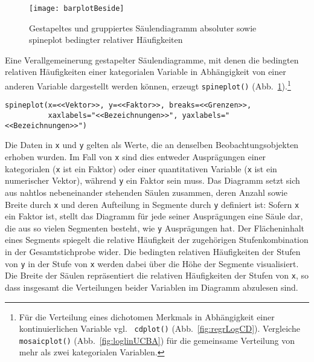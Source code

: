 \begin{figure}[ht]
\centering
\texttt{[image: barplotBeside]}
\vspace*{-1em}
\caption{Gestapeltes und gruppiertes Säulendiagramm absoluter sowie spineplot bedingter relativer Häufigkeiten}
\label{fig:barplotBeside}
\end{figure}

Eine Verallgemeinerung gestapelter Säulendiagramme, mit denen die bedingten relativen Häufigkeiten einer kategorialen Variable in Abhängigkeit von einer anderen Variable dargestellt werden können, erzeugt \lstinline!spineplot()! (Abb.\ \ref{fig:barplotBeside}).\footnote{Für die Verteilung eines dichotomen Merkmals in Abhängigkeit einer kontinuierlichen Variable vgl.\  \lstinline!cdplot()! (Abb.\ \ref{fig:regrLogCD}). Vergleiche \lstinline!mosaicplot()! (Abb.\ \ref{fig:loglinUCBA}) für die gemeinsame Verteilung von mehr als zwei kategorialen Variablen.}
\begin{lstlisting}
spineplot(x=<<Vektor>>, y=<<Faktor>>, breaks=<<Grenzen>>,
          xaxlabels="<<Bezeichnungen>>", yaxlabels="<<Bezeichnungen>>")
\end{lstlisting}

Die Daten in \lstinline!x! und \lstinline!y! gelten als Werte, die an denselben Beobachtungsobjekten erhoben wurden. Im Fall von \lstinline!x! sind dies entweder Ausprägungen einer kategorialen (\lstinline!x! ist ein Faktor) oder einer quantitativen Variable (\lstinline!x! ist ein numerischer Vektor), während \lstinline!y! ein Faktor sein muss. Das Diagramm setzt sich aus nahtlos nebeneinander stehenden Säulen zusammen, deren Anzahl sowie Breite durch \lstinline!x! und deren Aufteilung in Segmente durch \lstinline!y! definiert ist: Sofern \lstinline!x! ein Faktor ist, stellt das Diagramm für jede seiner Ausprägungen eine Säule dar, die aus so vielen Segmenten besteht, wie \lstinline!y! Ausprägungen hat. Der Flächeninhalt eines Segments spiegelt die relative Häufigkeit der zugehörigen Stufenkombination in der Gesamtstichprobe wider. Die bedingten relativen Häufigkeiten der Stufen von \lstinline!y! in der Stufe von \lstinline!x! werden dabei über die Höhe der Segmente visualisiert. Die Breite der Säulen repräsentiert die relativen Häufigkeiten der Stufen von \lstinline!x!, so dass insgesamt die Verteilungen beider Variablen im Diagramm abzulesen sind.

